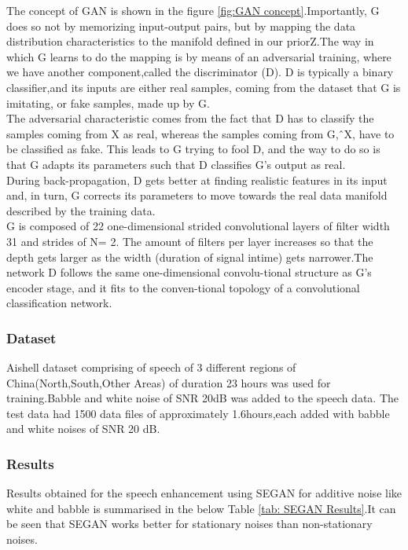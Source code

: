 \documentclass[12pt]{article}
\begin{document}
The concept of GAN is shown in the figure \ref{fig:GAN concept}.Importantly, G does so not by memorizing input-output pairs, but by mapping the data distribution characteristics to the manifold defined in our priorZ.The way in which G learns to do the mapping is by means of an adversarial training, where we have another component,called the discriminator (D). D is typically a binary classifier,and its inputs are either real samples, coming from the dataset that G is imitating, or fake samples, made up by G. \\
The adversarial characteristic comes from the fact that D has to classify the samples coming from X as real, whereas the samples coming from G,ˆX, have to be classified as fake. This leads to G trying to fool D, and the way to do so is that G adapts its parameters such that D classifies G’s output as real.\\ 
During back-propagation, D gets better at finding realistic features in its input and, in turn, G corrects its parameters to move towards the real data manifold described by the training data. \\
G is composed of 22 one-dimensional strided convolutional layers of filter width 31 and strides of N= 2. The amount of filters per layer increases so that the depth gets larger as the width (duration of signal intime) gets narrower.The network D follows the same one-dimensional convolu-tional structure as G’s encoder stage, and it fits to the conven-tional topology of a convolutional classification network.\\ 

\subsubsection{Dataset}

Aishell dataset comprising of speech of 3 different regions of China(North,South,Other Areas) of duration 23 hours was used for training.Babble and white noise of SNR 20dB was added to the speech data. The test data had 1500 data files of approximately 1.6hours,each added with babble and white noises of SNR 20 dB.

\subsubsection{Results}
Results obtained for the speech enhancement using SEGAN for additive noise like white and babble is summarised in the below Table \ref{tab: SEGAN Results}.It can be seen that SEGAN works better for stationary noises than non-stationary noises.
\end{document}
